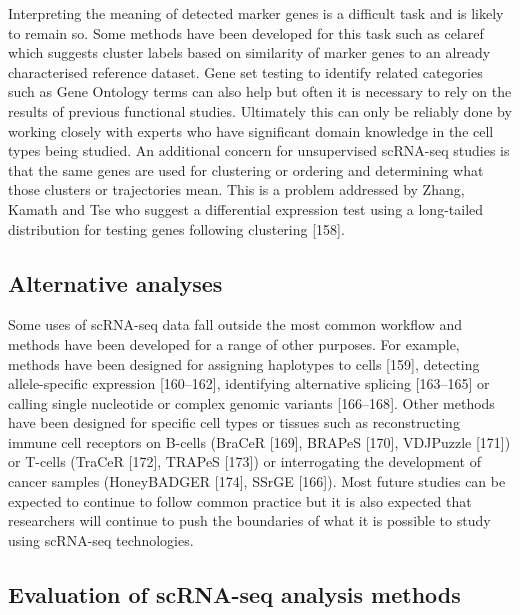 \documentclass[11pt,a4paper,titlepage,twoside,openright]{style/unimelbthesis}
\theoremstyle{definition}
\theoremstyle{definition}
\theoremstyle{definition}
\theoremstyle{remark}
\begin{document}
\begin{mainmatter}
Interpreting the meaning of detected marker genes is a difficult task and is likely to remain so. Some methods have been developed for this task such as celaref which suggests cluster labels based on similarity of marker genes to an already characterised reference dataset. Gene set testing to identify related categories such as Gene Ontology terms can also help but often it is necessary to rely on the results of previous functional studies. Ultimately this can only be reliably done by working closely with experts who have significant domain knowledge in the cell types being studied. An additional concern for unsupervised scRNA-seq studies is that the same genes are used for clustering or ordering and determining what those clusters or trajectories mean. This is a problem addressed by Zhang, Kamath and Tse who suggest a differential expression test using a long-tailed distribution for testing genes following clustering {[}158{]}.

\hypertarget{alternative-analyses}{%
\subsection{Alternative analyses}\label{alternative-analyses}}

Some uses of scRNA-seq data fall outside the most common workflow and methods have been developed for a range of other purposes. For example, methods have been designed for assigning haplotypes to cells {[}159{]}, detecting allele-specific expression {[}160--162{]}, identifying alternative splicing {[}163--165{]} or calling single nucleotide or complex genomic variants {[}166--168{]}. Other methods have been designed for specific cell types or tissues such as reconstructing immune cell receptors on B-cells (BraCeR {[}169{]}, BRAPeS {[}170{]}, VDJPuzzle {[}171{]}) or T-cells (TraCeR {[}172{]}, TRAPeS {[}173{]}) or interrogating the development of cancer samples (HoneyBADGER {[}174{]}, SSrGE {[}166{]}). Most future studies can be expected to continue to follow common practice but it is also expected that researchers will continue to push the boundaries of what it is possible to study using scRNA-seq technologies.

\hypertarget{evaluation-of-scrna-seq-analysis-methods}{%
\subsection{Evaluation of scRNA-seq analysis methods}\label{evaluation-of-scrna-seq-analysis-methods}}


\end{mainmatter}
\end{document}
